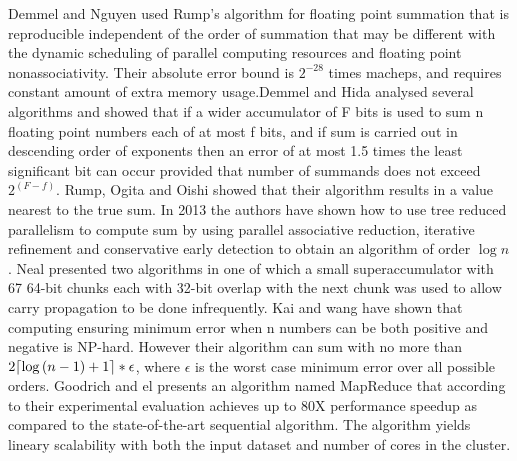 \documentclass[11pt]{article}       %
\DeclarePairedDelimiter{\ceil}{\lceil}{\rceil}
\begin{document}
Demmel and Nguyen \cite{PRS} used Rump’s algorithm for floating point summation that is reproducible independent of the order of summation that may be different with the dynamic scheduling of parallel computing resources and floating point nonassociativity. Their absolute error bound is $2^{-28}$ times macheps, and requires constant amount of extra memory usage.Demmel and Hida \cite{AEFPS} analysed several algorithms and showed that if a wider accumulator of F bits is used to sum n floating point numbers each of at most f bits, and if sum is carried out in descending order of exponents then an error of at most 1.5 times the least significant bit can occur provided that number of summands does not exceed $2^{(F-f)}$.
Rump, Ogita and Oishi \cite{AFPSPFR} showed that their algorithm results in a value nearest to the true sum. 
In 2013 the authors \cite{APFPA} have shown how to use tree reduced parallelism to compute sum by using parallel associative reduction, iterative refinement and conservative early detection to obtain an algorithm of order $\log {n}$. 
Neal \cite{FESUSLS} presented two algorithms in one of which a small superaccumulator with 67 64-bit chunks each with 32-bit overlap with the next chunk was used to allow carry propagation to be done infrequently. Kai and wang \cite{LTALCNS} have shown that computing ensuring minimum error when n numbers can be both positive and negative is NP-hard. However their algorithm can sum with no more than $2\ceil*{\log {(n-1)}+1}*\epsilon$, where $\epsilon$ is the worst case minimum error over all possible orders.
Goodrich and el \cite{PASFPN} presents an algorithm named MapReduce that according to their experimental evaluation achieves up to 80X performance speedup as compared to the state-of-the-art sequential algorithm. The algorithm yields lineary scalability with both the input dataset and number of cores in the cluster.





\end{document}
